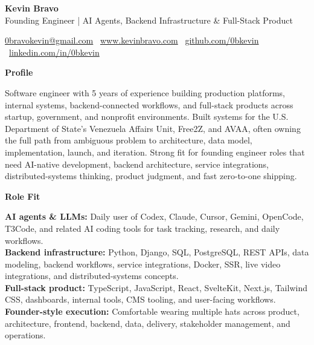\documentclass[11pt]{article}
\begin{document}
\begin{center}
    {\LARGE \textbf{Kevin Bravo}}\\
    Founding Engineer | AI Agents, Backend Infrastructure \& Full-Stack Product \\
    \hrulefill
\end{center}
\begin{center}
    \href{mailto:0bravokevin@gmail.com}{0bravokevin@gmail.com}
    \textbullet\
    \href{https://www.kevinbravo.com}{www.kevinbravo.com}
    \textbullet\
    \href{https://github.com/0bkevin}{github.com/0bkevin}
    \textbullet\
    \href{https://www.linkedin.com/in/0bkevin/}{linkedin.com/in/0bkevin}
\end{center}
\vspace{4pt}
\begin{center}
    \textbf{Profile}
\end{center}
\vspace{-4pt}
Software engineer with 5 years of experience building production platforms, internal systems, backend-connected workflows, and full-stack products across startup, government, and nonprofit environments. Built systems for the U.S. Department of State's Venezuela Affairs Unit, Free2Z, and AVAA, often owning the full path from ambiguous problem to architecture, data model, implementation, launch, and iteration. Strong fit for founding engineer roles that need AI-native development, backend architecture, service integrations, distributed-systems thinking, product judgment, and fast zero-to-one shipping.

\vspace{8pt}
\begin{center}
    \textbf{Role Fit}
\end{center}
\vspace{-4pt}
\textbf{AI agents \& LLMs:} Daily user of Codex, Claude, Cursor, Gemini, OpenCode, T3Code, and related AI coding tools for task tracking, research, and daily workflows. \\
\textbf{Backend infrastructure:} Python, Django, SQL, PostgreSQL, REST APIs, data modeling, backend workflows, service integrations, Docker, SSR, live video integrations, and distributed-systems concepts. \\
\textbf{Full-stack product:} TypeScript, JavaScript, React, SvelteKit, Next.js, Tailwind CSS, dashboards, internal tools, CMS tooling, and user-facing workflows. \\
\textbf{Founder-style execution:} Comfortable wearing multiple hats across product, architecture, frontend, backend, data, delivery, stakeholder management, and operations.
\end{document}
